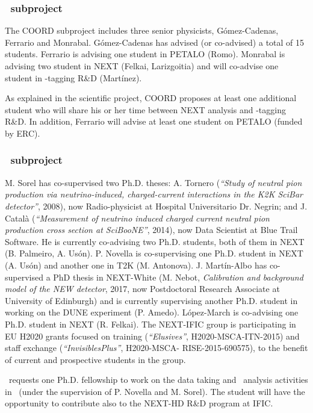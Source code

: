 \subsubsection*{\sDIPC\ subproject}
The COORD subproject includes three senior physicists, G\'omez-Cadenas, Ferrario and Monrabal. G\'omez-Cadenas has advised (or co-advised) a total of 15 students.  Ferrario is advising one student in PETALO (Romo). Monrabal is advising two student in NEXT (Felkai, Larizgoitia) and will co-advise one student in \Bapp-tagging R\&D (Mart\'{i}nez).

As explained in the scientific project, COORD proposes at least one additional student who will share his or her time between NEXT analysis and \Bapp-tagging R\&D. In addition, Ferrario will advise at least one student on PETALO (funded by ERC).

\subsubsection*{\sIFIC\ subproject}
M. Sorel has co-supervised two Ph.D. theses: A. Tornero ({\it ``Study of neutral pion production via neutrino-induced, charged-current interactions in the K2K SciBar detector''}, 2008), now Radio-physicist at Hospital
Universitario Dr. Negrin; and J. Catal\`a ({\it ``Measurement of neutrino induced charged current neutral pion production cross section at SciBooNE''}, 2014), now Data Scientist at Blue Trail Software. He is currently co-advising two Ph.D. students, both of them in NEXT (B. Palmeiro, A. Us\'on). P. Novella is co-supervising one Ph.D. student in NEXT (A. Us\'on) and another one in T2K (M. Antonova). J. Mart\'in-Albo has co-supervised a PhD thesis in NEXT-White (M. Nebot, {\it Calibration and background model of the NEW detector}, 2017, now Postdoctoral Research Associate at University of Edinburgh) and is currently supervising another Ph.D. student in working on the DUNE experiment (P. Amedo). L\'opez-March is co-advising one Ph.D. student in NEXT (R. Felkai). The NEXT-IFIC group is participating in EU H2020 grants focused on training ({\it ``Elusives''}, H2020-MSCA-ITN-2015) and staff exchange ({\it ``InvisiblesPlus''}, H2020-MSCA- RISE-2015-690575), to the benefit of current and prospective students in the group.

\sIFIC\ requests one Ph.D. fellowship to work on the data taking and \bb\ analysis activities in \Next\ (under the supervision of P. Novella and M. Sorel). The student will have the opportunity to contribute also to the NEXT-HD R\&D program at IFIC.


